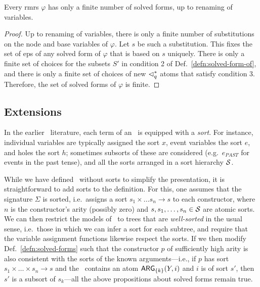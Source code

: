 \begin{prop}  \label{prop:finite-solved-forms}
  Every {\sc rmrs} $\varphi$ has only a finite number of solved forms, up to
  renaming of variables.
\end{prop}
\begin{proof}
  Up to renaming of variables, there is only a finite number of
  substitutions on the node and base variables of $\varphi$.  Let $s$
  be such a substitution.  This fixes the set of {\sc ep}s of any solved
  form of $\varphi$ that is based on $s$ uniquely.  There is only a
  finite set of choices for the subsets $S'$ in condition 2 of
  Def.~\ref{defn:solved-form-of}, and there is only a finite set of
  choices of new $\lhd^*_q$ atoms that satisfy condition 3.  Therefore,
  the set of solved forms of $\varphi$ is finite.
\end{proof}




\subsection{Extensions}
\label{sec:extensions}

In the earlier \rmrs\ literature, each term of an \rmrs\ is equipped
with a \emph{sort}.  For instance, individual variables are typically
assigned the sort $x$, event variables the sort $e$, and holes the
sort $h$; sometimes subsorts of these are considered (e.g.\ $e_{PAST}$
for events in the past tense), and all the sorts arranged in a sort
hierarchy ${\cal S}$.

While we have defined \rmrs\ without sorts to simplify the
presentation, it is straightforward to add sorts to the definition.
For this, one assumes that the signature $\Sigma$ is sorted, i.e.\
assigns a sort $s_1\times\ldots s_n\rightarrow s$ to each constructor,
where $n$ is the constructor's arity (possibly zero) and
$s,s_1,\ldots,s_n\in {\cal S}$ are atomic sorts.  We can then
restrict the models of \rmrs\ to trees that are \emph{well-sorted} in
the usual sense, i.e.\ those in which we can infer a sort for each
subtree, and require that the variable assignment functions likewise
respect the sorts.  If we then modify Def.~\ref{defn:solved-forms}
such that the constructor $p$ of sufficiently high arity is also
consistent with the sorts of the known arguments---i.e., if $p$ has
sort $s_1 \times \ldots \times s_n \rightarrow s$ and the \rmrs\
contains an atom $\mathsf{ARG}_{\{k\}}(Y,i)$ and $i$ is of sort $s'$, then
$s'$ is a subsort of $s_k$---all the above propositions about solved
forms remain true.

